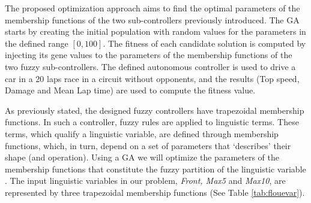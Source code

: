 \documentclass[conference]{IEEEtran}
\begin{document}


The proposed optimization approach aims to find the optimal parameters of the membership functions of the two sub-controllers previously introduced. 
The GA starts by creating the initial population with random values
for the parameters in the defined range $[0,100]$. The fitness of each
candidate solution is computed by injecting its gene values to the
parameters of the membership functions of the two fuzzy
sub-controllers. The defined autonomous controller is used to drive a
car in a 20 laps race in a circuit without opponents, and the
results (Top speed, Damage and Mean Lap time) are used to compute the
fitness value. 



As previously stated, the designed fuzzy controllers have trapezoidal membership functions. %
In such a controller, fuzzy rules are applied to linguistic
terms. These terms, which qualify a linguistic variable, are defined
through membership functions, which, in turn, depend on a set of
parameters that `describes' their shape (and operation). Using a GA we
will optimize the parameters of the membership functions that
constitute the fuzzy partition of the linguistic variable
\cite{ThangG08}. The input linguistic variables in our problem,
\textit{Front, Max5} and \textit{Max10}, are represented by three
trapezoidal membership functions (See Table \ref{tab:flouevar}). %
\end{document}
